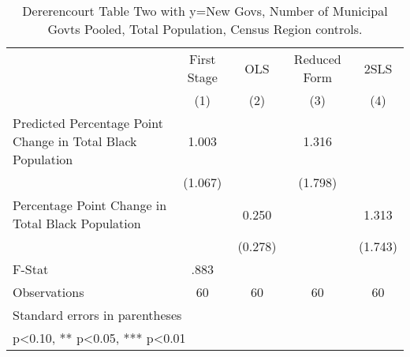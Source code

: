 \begin{table}[htbp]\centering
\def\sym#1{\ifmmode^{#1}\else\(^{#1}\)\fi}
\caption{Dererencourt Table Two with y=New Govs, Number of Municipal Govts  Pooled, Total Population, Census Region controls.}
\begin{tabular}{l*{4}{c}}
\toprule
                    & First Stage   &         OLS   &Reduced Form   &        2SLS   \\
                    &\multicolumn{1}{c}{(1)}   &\multicolumn{1}{c}{(2)}   &\multicolumn{1}{c}{(3)}   &\multicolumn{1}{c}{(4)}   \\
\midrule
Predicted Percentage Point Change in Total Black Population&       1.003   &               &       1.316   &               \\
                    &     (1.067)   &               &     (1.798)   &               \\
\addlinespace
Percentage Point Change in Total Black Population&               &       0.250   &               &       1.313   \\
                    &               &     (0.278)   &               &     (1.743)   \\
\midrule
F-Stat              &        .883   &               &               &               \\
Observations        &          60   &          60   &          60   &          60   \\
\bottomrule
\multicolumn{5}{l}{\footnotesize Standard errors in parentheses}\\
\multicolumn{5}{l}{\footnotesize * p<0.10, ** p<0.05, *** p<0.01}\\
\end{tabular}
\end{table}
